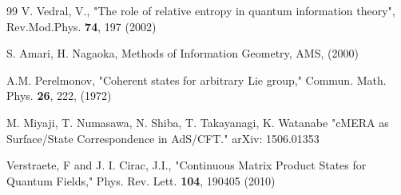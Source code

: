 \documentclass[preprint,aps]{revtex4}
\begin{document}
\begin{thebibliography}{99}
 V. Vedral, V., "The role of relative entropy in quantum information theory", Rev.Mod.Phys. {\bf 74}, 197 (2002)

 S. Amari, H. Nagaoka, Methods of Information Geometry, AMS, (2000)

 A.M. Perelmonov, "Coherent states for arbitrary Lie group," Commun. Math. Phys. {\bf 26}, 222, (1972)

 M. Miyaji, T. Numasawa, N. Shiba, T. Takayanagi, K. Watanabe "cMERA as Surface/State Correspondence in AdS/CFT." arXiv: 1506.01353

 Verstraete, F and J. I. Cirac, J.I., "Continuous Matrix Product States for Quantum Fields," Phys. Rev. Lett. {\bf 104}, 190405 (2010)

\end{thebibliography}
\end{document}
